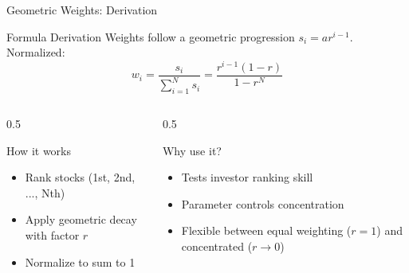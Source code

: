 \documentclass[12pt, aspectratio=43]{beamer}
\begin{document}
	\begin{frame}{Geometric Weights: Derivation}
		\vspace{-4mm}
		\footnotesize
		\begin{block}{Formula Derivation}
			Weights follow a geometric progression $s_i = a r^{i-1}$. Normalized:
			\[
			w_i = \frac{s_i}{\sum_{i=1}^N s_i} = \frac{r^{i-1}(1-r)}{1-r^N}
			\]
		\end{block}
		\vspace{-3mm}
		\begin{columns}[T]
			\begin{column}{0.5\textwidth}
				\begin{block}{How it works}
					\begin{itemize}
						\item Rank stocks (1st, 2nd, ..., Nth)
						\item Apply geometric decay with factor $r$
						\item Normalize to sum to 1
					\end{itemize}
				\end{block}
			\end{column}
			
			\begin{column}{0.5\textwidth}
				\begin{block}{Why use it?}
					\begin{itemize}
						\item Tests investor ranking skill
						\item Parameter controls concentration
						\item Flexible between equal weighting ($r=1$) and concentrated ($r \to 0$)
					\end{itemize}
				\end{block}
			\end{column}
		\end{columns}
	\end{frame}
	
\end{document}
